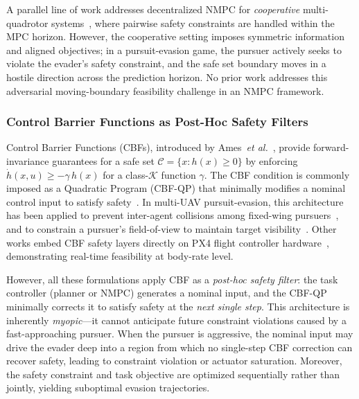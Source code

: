 \documentclass[lettersize,journal]{IEEEtran}
\theoremstyle{definition}
\theoremstyle{remark}
\begin{document}
A parallel line of work addresses decentralized NMPC for
\emph{cooperative} multi-quadrotor systems~\cite{zeng2024decentralized},
where pairwise safety constraints are handled within the MPC horizon.
However, the cooperative setting imposes symmetric information and
aligned objectives; in a pursuit-evasion game, the pursuer actively
seeks to violate the evader's safety constraint, and the safe set
boundary moves in a hostile direction across the prediction horizon.
No prior work addresses this adversarial moving-boundary feasibility
challenge in an NMPC framework.

\subsubsection{Control Barrier Functions as Post-Hoc Safety Filters}
Control Barrier Functions (CBFs), introduced by
Ames~\emph{et al.}~\cite{ames2019control}, provide forward-invariance
guarantees for a safe set $\mathcal{C} = \{x : h(x) \geq 0\}$ by
enforcing $\dot{h}(x,u) \geq -\gamma\,h(x)$ for a class-$\mathcal{K}$
function $\gamma$.
The CBF condition is commonly imposed as a Quadratic Program (CBF-QP)
that minimally modifies a nominal control input to satisfy
safety~\cite{ames2019control}.
In multi-UAV pursuit-evasion, this architecture has been applied
to prevent inter-agent collisions among
fixed-wing pursuers~\cite{chu2024control},
and to constrain a pursuer's field-of-view to maintain target
visibility~\cite{zhou2025control}.
Other works embed CBF safety layers directly on PX4 flight
controller hardware~\cite{zhang2025embedded}, demonstrating
real-time feasibility at body-rate level.

However, all these formulations apply CBF as a \emph{post-hoc
safety filter}: the task controller (planner or NMPC) generates a
nominal input, and the CBF-QP minimally corrects it to satisfy
safety at the \emph{next single step}.
This architecture is inherently \emph{myopic}---it cannot anticipate
future constraint violations caused by a fast-approaching pursuer.
When the pursuer is aggressive, the nominal input may drive the
evader deep into a region from which no single-step CBF correction
can recover safety, leading to constraint violation or actuator
saturation.
Moreover, the safety constraint and task objective are optimized
sequentially rather than jointly, yielding suboptimal evasion
trajectories.
\end{document}
